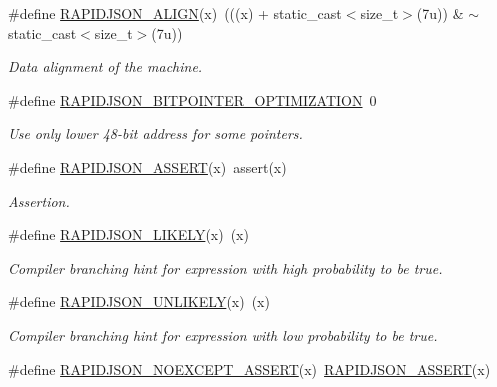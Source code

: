 \begin{DoxyCompactItemize}
\#define \mbox{\hyperlink{group___r_a_p_i_d_j_s_o_n___c_o_n_f_i_g_ga583915242504c7fdb36e826f02f76242}{R\+A\+P\+I\+D\+J\+S\+O\+N\+\_\+\+A\+L\+I\+GN}}(x)~(((x) + static\+\_\+cast$<$size\+\_\+t$>$(7u)) \& $\sim$static\+\_\+cast$<$size\+\_\+t$>$(7u))
\begin{DoxyCompactList}\small\item\em Data alignment of the machine. \end{DoxyCompactList}\item 
\#define \mbox{\hyperlink{group___r_a_p_i_d_j_s_o_n___c_o_n_f_i_g_ga93fb983f78208d12c822376e1ea6d185}{R\+A\+P\+I\+D\+J\+S\+O\+N\+\_\+B\+I\+T\+P\+O\+I\+N\+T\+E\+R\+\_\+\+O\+P\+T\+I\+M\+I\+Z\+A\+T\+I\+ON}}~0
\begin{DoxyCompactList}\small\item\em Use only lower 48-\/bit address for some pointers. \end{DoxyCompactList}\item 
\#define \mbox{\hyperlink{group___r_a_p_i_d_j_s_o_n___c_o_n_f_i_g_gabeba18d612187bad2ac62aed9276d47c}{R\+A\+P\+I\+D\+J\+S\+O\+N\+\_\+\+A\+S\+S\+E\+RT}}(x)~assert(x)
\begin{DoxyCompactList}\small\item\em Assertion. \end{DoxyCompactList}\item 
\#define \mbox{\hyperlink{group___r_a_p_i_d_j_s_o_n___c_o_n_f_i_g_ga5dc14176a9e71ace282404b0bcda57a1}{R\+A\+P\+I\+D\+J\+S\+O\+N\+\_\+\+L\+I\+K\+E\+LY}}(x)~(x)
\begin{DoxyCompactList}\small\item\em Compiler branching hint for expression with high probability to be true. \end{DoxyCompactList}\item 
\#define \mbox{\hyperlink{group___r_a_p_i_d_j_s_o_n___c_o_n_f_i_g_ga6a2b1695c13e77ae425e3cbac980ccb5}{R\+A\+P\+I\+D\+J\+S\+O\+N\+\_\+\+U\+N\+L\+I\+K\+E\+LY}}(x)~(x)
\begin{DoxyCompactList}\small\item\em Compiler branching hint for expression with low probability to be true. \end{DoxyCompactList}\item 
\#define \mbox{\hyperlink{group___r_a_p_i_d_j_s_o_n___c_o_n_f_i_g_ga2b2a0d9143aa4fb31205a85b34c43952}{R\+A\+P\+I\+D\+J\+S\+O\+N\+\_\+\+N\+O\+E\+X\+C\+E\+P\+T\+\_\+\+A\+S\+S\+E\+RT}}(x)~\mbox{\hyperlink{group___r_a_p_i_d_j_s_o_n___c_o_n_f_i_g_gabeba18d612187bad2ac62aed9276d47c}{R\+A\+P\+I\+D\+J\+S\+O\+N\+\_\+\+A\+S\+S\+E\+RT}}(x)

\end{DoxyCompactItemize}
